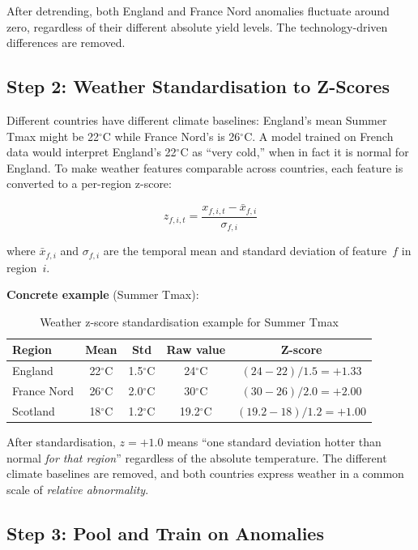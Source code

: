 \documentclass[12pt,a4paper]{report}
\newcommand{\degrees}{$^{\circ}$C}
\begin{document}
After detrending, both England and France Nord anomalies fluctuate around zero, regardless of their different absolute yield levels. The technology-driven differences are removed.

\subsection{Step 2: Weather Standardisation to Z-Scores}

Different countries have different climate baselines: England's mean Summer Tmax might be 22\degrees{} while France Nord's is 26\degrees{}. A model trained on French data would interpret England's 22\degrees{} as ``very cold,'' when in fact it is normal for England. To make weather features comparable across countries, each feature is converted to a per-region z-score:

\begin{equation}
    z_{f,i,t} = \frac{x_{f,i,t} - \bar{x}_{f,i}}{\sigma_{f,i}}
\end{equation}

where $\bar{x}_{f,i}$ and $\sigma_{f,i}$ are the temporal mean and standard deviation of feature~$f$ in region~$i$.

\textbf{Concrete example} (Summer Tmax):

\begin{table}[H]
\centering
\caption{Weather z-score standardisation example for Summer Tmax}
\label{tab:zscore_example}
\begin{tabular}{lcccc}
\toprule
\textbf{Region} & \textbf{Mean} & \textbf{Std} & \textbf{Raw value} & \textbf{Z-score} \\
\midrule
England & 22\degrees{} & 1.5\degrees{} & 24\degrees{} & $(24 - 22)/1.5 = +1.33$ \\
France Nord & 26\degrees{} & 2.0\degrees{} & 30\degrees{} & $(30 - 26)/2.0 = +2.00$ \\
Scotland & 18\degrees{} & 1.2\degrees{} & 19.2\degrees{} & $(19.2 - 18)/1.2 = +1.00$ \\
\bottomrule
\end{tabular}
\end{table}

After standardisation, $z = +1.0$ means ``one standard deviation hotter than normal \emph{for that region}'' regardless of the absolute temperature. The different climate baselines are removed, and both countries express weather in a common scale of \emph{relative abnormality}.

\subsection{Step 3: Pool and Train on Anomalies}
\end{document}
